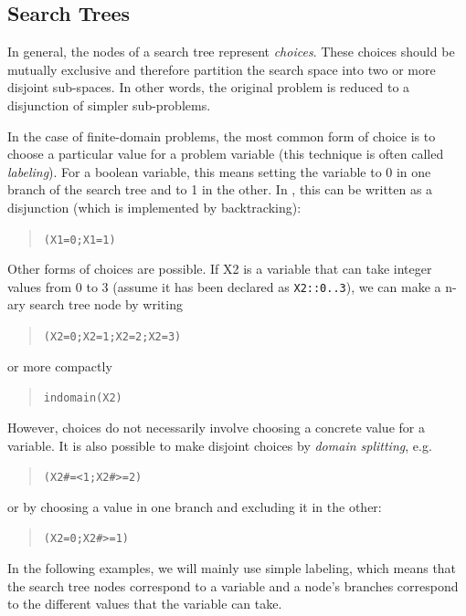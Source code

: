 \subsection{Search Trees}

In general, the nodes of a search tree represent {\em choices}.
These choices should be mutually exclusive and therefore partition the
search space into two or more disjoint sub-spaces.
In other words, the original problem is reduced to a disjunction
of simpler sub-problems.

In the case of finite-domain problems, the most common form of choice
is to choose a particular value for a problem variable
(this technique is often called
{\em labeling}).
For a boolean variable, this means setting the variable to 0 in one
branch of the search tree and to 1 in the other.
In {\eclipse}, this can be written as a disjunction
(which is implemented by backtracking):
\begin{quote}\begin{alltt}
( X1=0 ; X1=1 )
\end{alltt}\end{quote}
Other forms of choices are possible. If X2 is a variable that can take
integer values from 0 to 3 (assume it has been declared as \verb'X2::0..3'),
we can make a n-ary search tree node by writing
\begin{quote}\begin{alltt}
( X2=0 ; X2=1 ; X2=2 ; X2=3 )
\end{alltt}\end{quote}
or more compactly
\begin{quote}\begin{alltt}
indomain(X2)
\end{alltt}\end{quote}
However, choices do not necessarily involve choosing a concrete value
for a variable. It is also possible to make disjoint choices by
{\em domain splitting}, e.g.
\begin{quote}\begin{alltt}
( X2 #=< 1 ; X2 #>= 2 )
\end{alltt}\end{quote}
or by choosing a value in one branch and excluding it in the other:
\begin{quote}\begin{alltt}
( X2 = 0 ; X2 #>= 1 )
\end{alltt}\end{quote}
In the following examples, we will mainly use simple labeling,
which means that the search tree nodes correspond to a variable
and a node's branches correspond to the different values that the
variable can take.


